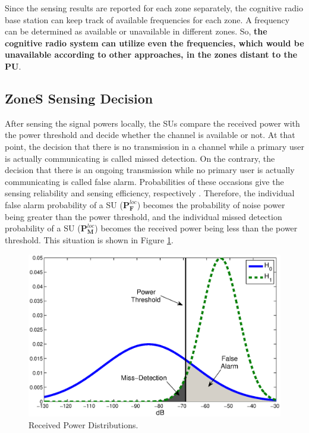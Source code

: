 \documentclass[conference,compsoc]{IEEEtran}
\newcommand{\probmlocal}{\mathbf{P}_\mathbf{M}^{loc}}
\newcommand{\probflocal}{\mathbf{P}_\mathbf{F}^{loc}}
\newcommand{\CR}{cognitive radio }
\begin{document}
Since the sensing results are reported for each zone separately, the \CR base station can keep track of available frequencies for each zone. A frequency can be determined as available or unavailable in different zones. So, \textbf{the \CR system can utilize even the frequencies, which would be unavailable according to other approaches, in the zones distant to the PU}.

\subsection{ZoneS Sensing Decision}
After sensing the signal powers locally, the SUs compare the received power with the power threshold and decide whether the channel is available or not. At that point, the decision that there is no transmission in a channel while a primary user is actually communicating is called missed detection. On the contrary, the decision that there is an ongoing transmission while no primary user is actually communicating is called false alarm. Probabilities of these occasions give the sensing reliability and sensing efficiency, respectively \cite{UpToDateSensing}. Therefore, the individual false alarm probability of a SU ($\probflocal$) becomes the probability of noise power being greater than the power threshold, and the individual missed detection probability of a SU ($\probmlocal$) becomes the received power being less than the power threshold. This situation is shown in Figure \ref{fig:h0h1}.
\begin{figure}[!htb]
\centering
\includegraphics[width=0.99\columnwidth,keepaspectratio] {figs/h0_h1.eps}
\caption{Received Power Distributions.}
\label{fig:h0h1}
\end{figure}
\end{document}
